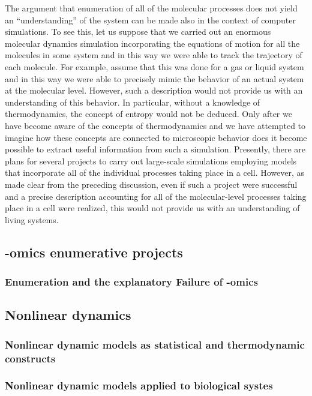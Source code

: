 \begin{longquote}
The argument that enumeration of all of the molecular processes does not
yield an “understanding” of the system can be made also in the context of
computer simulations. To see this, let us suppose that we carried out an enormous molecular dynamics simulation incorporating the equations of motion
for all the molecules in some system and in this way we were able to track the
trajectory of each molecule. For example, assume that this was done for a gas
or liquid system and in this way we were able to precisely mimic the behavior
of an actual system at the molecular level. However, such a description would
not provide us with an understanding of this behavior. In particular, without
a knowledge of thermodynamics, the concept of entropy would not be deduced. Only after we have become aware of the concepts of thermodynamics
and we have attempted to imagine how these concepts are connected to microscopic behavior does it become possible to extract useful information from
such a simulation. Presently, there are plans for several projects to carry out
large-scale simulations employing models that incorporate all of the individual
processes taking place in a cell. However, as made clear from the preceding
discussion, even if such a project were successful and a precise description
accounting for all of the molecular-level processes taking place in a cell were
realized, this would not provide us with an understanding of living systems.
\end{longquote}
\cite{Kaneko2006}

\subsection{-omics enumerative projects}
\subsubsection{Enumeration and the explanatory Failure of -omics}
\subsection{Nonlinear dynamics}
\subsubsection{Nonlinear dynamic models as statistical and thermodynamic constructs}
\subsubsection{Nonlinear dynamic models applied to biological systes}
